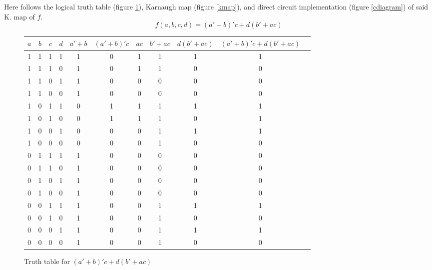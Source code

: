 \documentclass[11pt]{article}
\begin{document}
\begin{question}

	Here follows the logical truth table (figure \ref{ttable}), Karnaugh map (figure \ref{kmap}), and direct circuit
	implementation (figure \ref{cdiagram}) of said K. map of $f$. \[f(a,b,c,d) = (a'+b)'c+d(b'+ac)\]

	\begin{figure}[h]
		\begin{center}
			\begin{tabular} {c c c c | c c c c c c c}
				$a$ & $b$ & $c$ & $d$ & $a'+b$ & $(a'+b)'c$ & $ac$ & $b'+ac$ & $d(b'+ac)$ & $(a'+b)'c+d(b'+ac)$ \\
				\hline
				1 & 1 & 1 & 1 & 1 & 0 & 1 & 1 & 1 & 1 \\
				1 & 1 & 1 & 0 & 1 & 0 & 1 & 1 & 0 & 0 \\
				1 & 1 & 0 & 1 & 1 & 0 & 0 & 0 & 0 & 0 \\
				1 & 1 & 0 & 0 & 1 & 0 & 0 & 0 & 0 & 0 \\
				1 & 0 & 1 & 1 & 0 & 1 & 1 & 1 & 1 & 1 \\
				1 & 0 & 1 & 0 & 0 & 1 & 1 & 1 & 0 & 1 \\
				1 & 0 & 0 & 1 & 0 & 0 & 0 & 1 & 1 & 1 \\
				1 & 0 & 0 & 0 & 0 & 0 & 0 & 1 & 0 & 0 \\
				0 & 1 & 1 & 1 & 1 & 0 & 0 & 0 & 0 & 0 \\
				0 & 1 & 1 & 0 & 1 & 0 & 0 & 0 & 0 & 0 \\
				0 & 1 & 0 & 1 & 1 & 0 & 0 & 0 & 0 & 0 \\
				0 & 1 & 0 & 0 & 1 & 0 & 0 & 0 & 0 & 0 \\
				0 & 0 & 1 & 1 & 1 & 0 & 0 & 1 & 1 & 1 \\
				0 & 0 & 1 & 0 & 1 & 0 & 0 & 1 & 0 & 0 \\
				0 & 0 & 0 & 1 & 1 & 0 & 0 & 1 & 1 & 1 \\
				0 & 0 & 0 & 0 & 1 & 0 & 0 & 1 & 0 & 0 \\
			\end{tabular}
		\end{center}
		\caption{\label{ttable} Truth table for $(a'+b)'c+d(b'+ac)$}
	\end{figure}

	\begin{figure}[h]
		\begin{center}
\end{center}
\end{figure}
\end{question}
\end{document}
